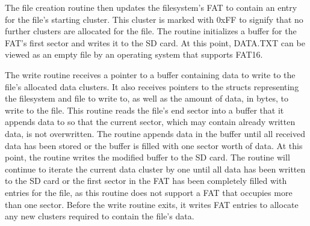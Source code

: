 The file creation routine then updates the filesystem's FAT to contain an entry for the file's starting cluster. This cluster is marked with 0xFF to signify that no further clusters are allocated for the file. The routine initializes a buffer for the FAT's first sector and writes it to the SD card. At this point, DATA.TXT can be viewed as an empty file by an operating system that supports FAT16.

The write routine receives a pointer to a buffer containing data to write to the file's allocated data clusters. It also receives pointers to the structs representing the filesystem and file to write to, as well as the amount of data, in bytes, to write to the file. This routine reads the file's end sector into a buffer that it appends data to so that the current sector, which may contain already written data, is not overwritten. The routine appends data in the buffer until all received data has been stored or the buffer is filled with one sector worth of data. At this point, the routine writes the modified buffer to the SD card. The routine will continue to iterate the current data cluster by one until all data has been written to the SD card or the first sector in the FAT has been completely filled with entries for the file, as this routine does not support a FAT that occupies more than one sector. Before the write routine exits, it writes FAT entries to allocate any new clusters required to contain the file's data. 





    
    
